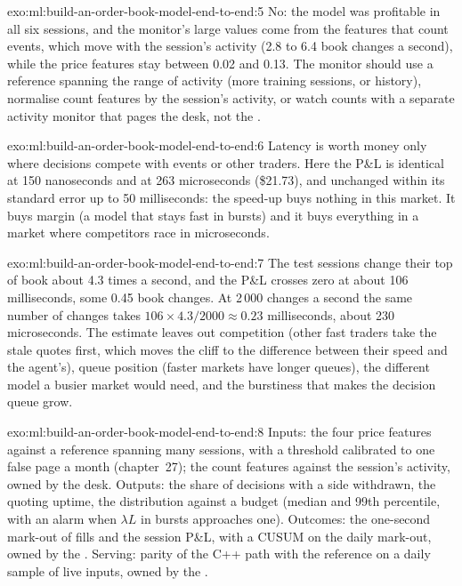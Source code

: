 \begin{solution}{exo:ml:build-an-order-book-model-end-to-end:5}
No: the model was profitable in all six sessions, and the monitor's large values come from the features that count events, which
move with the session's activity (2.8 to 6.4 book changes a second), while the price features stay between 0.02 and 0.13. The
monitor should use a reference spanning the range of activity (more training sessions, or history), normalise count features by
the session's activity, or watch counts with a separate activity monitor that pages the desk, not the .
\end{solution}

\begin{solution}{exo:ml:build-an-order-book-model-end-to-end:6}
Latency is worth money only where decisions compete with events or other traders. Here the P\&L is identical at 150 nanoseconds
and at 263 microseconds (\$21.73), and unchanged within its standard error up to 50 milliseconds: the speed-up buys nothing in
this market. It buys margin (a model that stays fast in bursts) and it buys everything in a market where competitors race in
microseconds.
\end{solution}

\begin{solution}{exo:ml:build-an-order-book-model-end-to-end:7}
The test sessions change their top of book about 4.3 times a second, and the P\&L crosses zero at about 106 milliseconds, some
0.45 book changes. At 2\,000 changes a second the same number of changes takes $106\times4.3/2000\approx0.23$ milliseconds, about
230 microseconds. The estimate leaves out competition (other fast traders take the stale quotes first, which moves the cliff to
the difference between their speed and the agent's), queue position (faster markets have longer queues), the different model a
busier market would need, and the burstiness that makes the decision queue grow.
\end{solution}

\begin{solution}{exo:ml:build-an-order-book-model-end-to-end:8}
Inputs: the four price features against a reference spanning many sessions, with a threshold calibrated to one false page a month
(chapter~27); the count features against the session's activity, owned by the desk. Outputs: the share of decisions with a side
withdrawn, the quoting uptime, the  distribution against a budget (median and 99th percentile, with an alarm when
$\lambda L$ in bursts approaches one). Outcomes: the one-second mark-out of fills and the session P\&L, with a CUSUM on the daily
mark-out, owned by the . Serving: parity of the C++ path with the reference on a daily sample of live inputs, owned by
the .
\end{solution}

